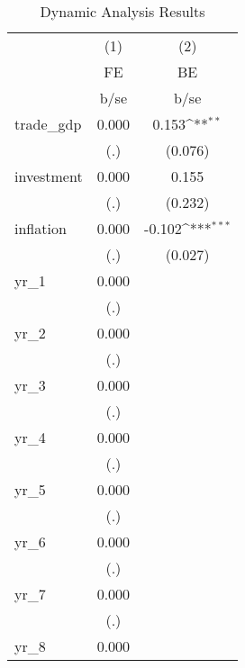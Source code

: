 \begin{table}[htbp]\centering
\def\sym#1{\ifmmode^{#1}\else\(^{#1}\)\fi}
\caption{Dynamic Analysis Results}
\begin{tabular}{l*{2}{c}}
\hline\hline
            &\multicolumn{1}{c}{(1)}&\multicolumn{1}{c}{(2)}\\
            &\multicolumn{1}{c}{FE}&\multicolumn{1}{c}{BE}\\
            &        b/se         &        b/se         \\
\hline
trade\_gdp   &       0.000         &       0.153\sym{**} \\
            &         (.)         &     (0.076)         \\
investment  &       0.000         &       0.155         \\
            &         (.)         &     (0.232)         \\
inflation   &       0.000         &      -0.102\sym{***}\\
            &         (.)         &     (0.027)         \\
yr\_1        &       0.000         &                     \\
            &         (.)         &                     \\
yr\_2        &       0.000         &                     \\
            &         (.)         &                     \\
yr\_3        &       0.000         &                     \\
            &         (.)         &                     \\
yr\_4        &       0.000         &                     \\
            &         (.)         &                     \\
yr\_5        &       0.000         &                     \\
            &         (.)         &                     \\
yr\_6        &       0.000         &                     \\
            &         (.)         &                     \\
yr\_7        &       0.000         &                     \\
            &         (.)         &                     \\
yr\_8        &       0.000         &                     \\

\end{tabular}
\end{table}
